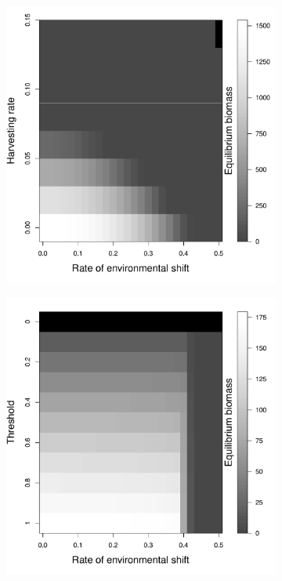 \documentclass[]{article}
\begin{document}
\begin{figure}[htbp]

\begin{subfigure}{.33\textwidth}
\subcaption{}
\includegraphics[width=\textwidth]{plots/eqbiomass_sim.pdf}
\end{subfigure}
\begin{subfigure}{.33\textwidth}
\subcaption{}
\includegraphics[width=\textwidth]{plots/eqbiomass_thresh.pdf}

\end{subfigure}
\end{figure}
\end{document}
